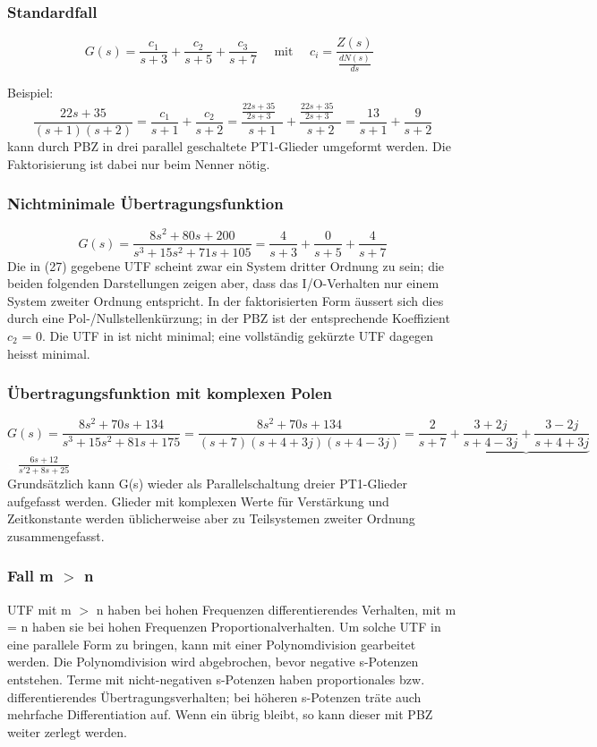 \subsubsection{Standardfall}

\[ G(s) =\frac{c_{1}}{s+3} + \frac{c_{2}}{s+5} + \frac{c_{3}}{s+7} \quad \text{ mit } \quad {c_{i}= \frac{Z(s)}{\frac{dN(s)}{ds}}\mathop{\Bigg|_{s=p_{i}}}}\]

Beispiel: \[\frac{22s +35}{(s+1)(s+2)}=\frac{c_{1}}{s+1}+\frac{c_{2}}{s+2}=\frac{\frac{22s+35}{2s+3}\mathop{\Big|_{s=-1}}}{s+1}+\frac{\frac{22s+35}{2s+3}\mathop{\Big|_{s=-2}}}{s+2}=\frac{13}{s+1}+\frac{9}{s+2}\]
kann durch PBZ in drei parallel geschaltete PT1-Glieder umgeformt werden. Die
Faktorisierung ist dabei nur beim Nenner nötig.

\subsubsection{Nichtminimale Übertragungsfunktion}
\[G(s) =\frac{8s^{2} + 80s + 200}{s^3 + 15s^2 + 71s + 105}= \frac{4}{s+3} + \frac{0}{s+5} + \frac{4}{s+7}\]
Die in (27) gegebene UTF scheint zwar ein System dritter Ordnung zu sein; die beiden
folgenden Darstellungen zeigen aber, dass das I/O-Verhalten nur einem System
zweiter Ordnung entspricht. In der faktorisierten Form äussert sich dies durch
eine Pol-/Nullstellenkürzung; in der PBZ ist der entsprechende Koeffizient $c_{2}$ = 0.
Die UTF in ist nicht minimal; eine vollständig gekürzte UTF dagegen heisst
minimal.

\subsubsection{Übertragungsfunktion mit komplexen Polen}
\[G(s) =\frac{8s^{2} + 70s + 134}{s^3 + 15s^2 + 81s + 175}= \frac{8s^2+70s+134}{(s+7)(s+4+3j)(s+4-3j)}=\frac{2}{s+7}+\underbrace{\frac{3+2j}{s+4-3j}+\frac{3-2j}{s+4+3j}}\]
\textcolor{white}{x} \hspace{14.5cm} $\frac{6s+12}{s'2+8s+25}$\\

Grundsätzlich kann G(s) wieder als Parallelschaltung dreier PT1-Glieder aufgefasst
werden. Glieder mit komplexen Werte für Verstärkung und Zeitkonstante werden
üblicherweise aber zu Teilsystemen zweiter Ordnung zusammengefasst.

\subsubsection{Fall m $>$ n}
UTF mit m $>$ n haben bei hohen Frequenzen differentierendes Verhalten, mit m = n
haben sie bei hohen Frequenzen Proportionalverhalten. Um solche UTF in eine
parallele Form zu bringen, kann mit einer Polynomdivision gearbeitet werden. Die Polynomdivision wird abgebrochen, bevor negative s-Potenzen entstehen. Terme mit nicht-negativen s-Potenzen haben proportionales
bzw. differentierendes Übertragungsverhalten; bei höheren s-Potenzen träte auch
mehrfache Differentiation auf. Wenn ein übrig bleibt, so kann dieser mit PBZ weiter zerlegt werden.

